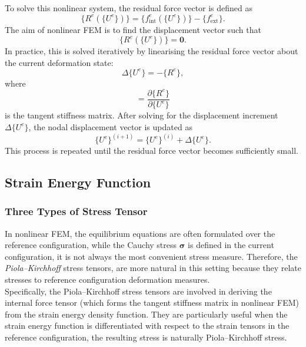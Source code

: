 \documentclass[12pt, a4paper]{article}
\numberwithin{equation}{section}
\begin{document}
To solve this nonlinear system, the residual force vector is defined as
\begin{equation}
    \{R^e(\{U^e\})\}
    =
    \{f_{\mathrm{int}}^e(\{U^e\})\}
    -
    \{f_{\mathrm{ext}}^e\}.
\end{equation}
The aim of nonlinear FEM is to find the displacement vector such that
\begin{equation}
    \{R^e(\{U^e\})\} = \mathbf{0}.
\end{equation}
In practice, this is solved iteratively by linearising the residual force vector about the current deformation state:
\begin{equation}
    [K_{\mathrm{tan}}^e]\Delta \{U^e\}
    =
    -
    \{R^e\},
\end{equation}
where
\begin{equation}
    [K_{\mathrm{tan}}^e]
    =
    \frac{\partial \{R^e\}}{\partial \{U^e\}}
\end{equation}
is the tangent stiffness matrix. After solving for the displacement increment $\Delta \{U^e\}$, the nodal displacement vector is updated as
\begin{equation}
    \{U^e\}^{(i+1)}
    =
    \{U^e\}^{(i)}
    +
    \Delta \{U^e\}.
\end{equation}
This process is repeated until the residual force vector becomes sufficiently small.

\newpage
\subsection{Strain Energy Function}

\subsubsection{Three Types of Stress Tensor}
In nonlinear FEM, the equilibrium equations are often formulated over the reference configuration, while the Cauchy stress $\boldsymbol{\sigma}$ is defined in the current configuration, it is not always the most convenient stress measure. Therefore, the \textit{Piola--Kirchhoff} stress tensors, are more natural in this setting because they relate stresses to reference configuration deformation measures.\\

Specifically, the Piola--Kirchhoff stress tensors are involved in deriving the internal force tensor (which forms the tangent stiffness matrix in nonlinear FEM) from the strain energy density function. They are particularly useful when the strain energy function is differentiated with respect to the strain tensors in the reference configuration, the resulting stress is naturally Piola--Kirchhoff stress.
\end{document}
